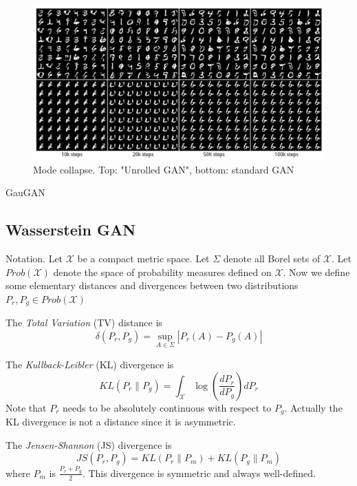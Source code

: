 \documentclass[english]{article}
\begin{document}
\begin{figure}
  \centering
  \includegraphics[scale=0.3]{mc.png}
    \caption{Mode collapse. Top: "Unrolled GAN", bottom: standard GAN}
    \label{mc}
\end{figure}

\item GauGAN
\eenum

\subsection{Wasserstein GAN}

\benum
\item {Notation}.
 Let $\mathcal{X}$ be a compact metric space. Let $\Sigma$ denote all Borel sets of  $\mathcal{X}$. Let $Prob(\mathcal{X})$ denote the space of probability measures defined on $\mathcal{X}$. Now we define some elementary distances and divergences between two distributions $P_r, P_g \in Prob(\mathcal{X})$


\item {The \emph{Total Variation} (TV) distance} is
$$ \delta(P_r, P_g)= \sup_{A\in \Sigma} {|P_r {(A)}-P_g {(A)}|}$$





\item {The \emph{Kullback-Leibler} (KL) divergence} is
 $$ KL(P_r \|P_g)= \int_\mathcal{X} \log(\frac{dP_r}{dP_g})dP_r$$
 Note that $P_r$ needs to be absolutely continuous with respect to $P_g$. Actually the KL divergence is not a distance since it is asymmetric.
 




\item {The \emph{Jensen-Shannon} (JS) divergence} is
$$ JS(P_r,P_g)=KL(P_r \|P_m)+ KL(P_g \|P_m)$$
where $P_m$ is $\frac{P_r+P_g}{2}$. This divergence is symmetric and always well-defined.
\end{document}

